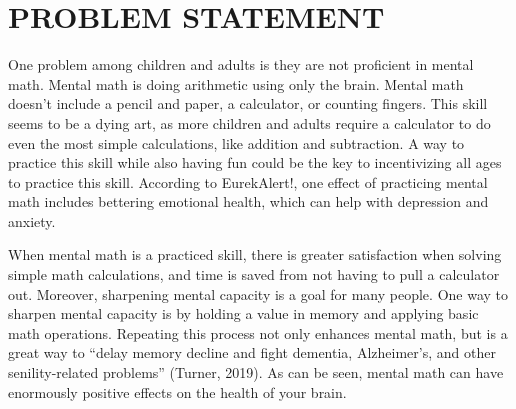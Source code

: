 \documentclass[12pt]{article}
\begin{document}
\section{PROBLEM STATEMENT}



One problem among children and adults is they are not proficient in mental math. Mental math is doing arithmetic using only the brain. Mental math doesn't include a pencil and paper, a calculator, or counting fingers. This skill seems to be a dying art, as more children and adults require a calculator to do even the most simple calculations, like addition and subtraction. 
A way to practice this skill while also having fun could be the key to incentivizing all ages to practice this skill. According to EurekAlert!, one effect of practicing mental math includes bettering emotional health, which can help with depression and anxiety.

When mental math is a practiced skill, there is greater satisfaction when solving simple math calculations, and time is saved from not having to pull a calculator out. 
Moreover, sharpening mental capacity is a goal for many people. One way to sharpen mental capacity is by holding a value in memory and applying basic math operations. Repeating this process not only enhances mental math, but is a great way to “delay memory decline and fight dementia, Alzheimer’s, and other senility-related problems” (Turner, 2019).
As can be seen, mental math can have enormously positive effects on the health of your brain. 
\end{document}
